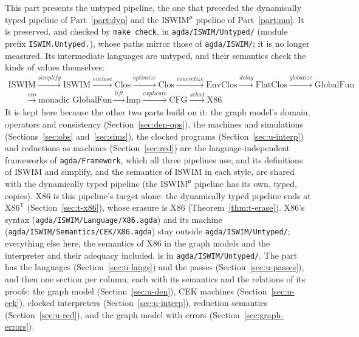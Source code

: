 \documentclass[10pt]{article}
\theoremstyle{acmplain}
\newcommand{\pass}[1]{\mathit{#1}}
\newcommand{\Tl}[1]{\textrm{#1}^{\mathsf{T}}}  %
\newcommand{\Ml}[1]{\textrm{#1}^{\mu}}                  %
\begin{document}
This part presents the untyped pipeline, the one that preceded the
dynamically typed pipeline of Part~\ref{part:dyn} and the $\Ml{ISWIM}$
pipeline of Part~\ref{part:mu}. It is preserved, and checked by
\texttt{make check}, in \texttt{agda/ISWIM/Untyped/} (module prefix
\texttt{ISWIM.Untyped.}), whose paths mirror those of \texttt{agda/ISWIM/}; it is no
longer measured. Its intermediate languages are untyped, and their
semantics check the kinds of values themselves:
\[
\begin{array}{l}
\mathrm{ISWIM} \xrightarrow{\pass{simplify}} \mathrm{ISWIM}
  \xrightarrow{\pass{enclose}} \mathrm{Clos} \xrightarrow{\pass{optimize}} \mathrm{Clos}
  \xrightarrow{\pass{concretize}} \mathrm{EnvClos} \xrightarrow{\pass{delay}} \mathrm{FlatClos}
  \xrightarrow{\pass{globalize}} \mathrm{GlobalFun} \\
\qquad \xrightarrow{\pass{rco}} \text{monadic GlobalFun}
  \xrightarrow{\pass{lift}} \mathrm{Imp} \xrightarrow{\pass{explicate}} \mathrm{CFG}
  \xrightarrow{\pass{select}} \mathrm{X86}
\end{array}
\]
It is kept here because the other two parts build on it: the graph
model's domain, operators and consistency (Section~\ref{sec:den-ops}), the
machines and simulations (Sections~\ref{sec:obs} and~\ref{sec:sims}), the
clocked programs (Section~\ref{sec:u-interp}) and reductions as machines
(Section~\ref{sec:red}) are the language-independent frameworks of
\texttt{agda/Framework}, which all three pipelines use; and its definitions
of ISWIM and simplify, and the semantics of ISWIM in each style, are
shared with the dynamically typed pipeline (the $\Ml{ISWIM}$ pipeline has
its own, typed, copies). X86 is this pipeline's target alone: the
dynamically typed pipeline ends at $\Tl{X86}$ (Section~\ref{sec:t-x86}),
whose erasure is X86 (Theorem~\ref{thm:t-erase}). X86's syntax
(\texttt{agda/\allowbreak ISWIM/\allowbreak Language/\allowbreak X86.agda}) and its machine
(\texttt{agda/\allowbreak ISWIM/\allowbreak Semantics/\allowbreak CEK/\allowbreak X86.agda}) stay
outside \texttt{agda/\allowbreak ISWIM/\allowbreak Untyped/}; everything else here, the
semantics of X86 in the graph models and the interpreter and their
adequacy included, is in \texttt{agda/ISWIM/Untyped/}. The part has the languages
(Section~\ref{sec:u-langs}) and the passes (Section~\ref{sec:u-passes}),
and then one section per column, each with its semantics and the
relations of its proofs: the graph model (Section~\ref{sec:u-den}), CEK
machines (Section~\ref{sec:u-cek}), clocked interpreters
(Section~\ref{sec:u-interp}), reduction semantics
(Section~\ref{sec:u-red}), and the graph model with errors
(Section~\ref{sec:graph-errors}).
\end{document}
